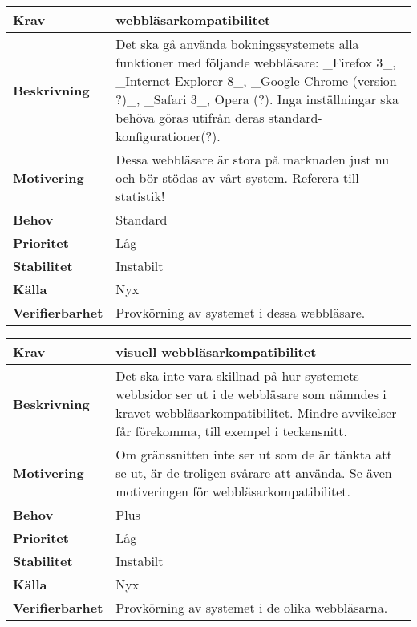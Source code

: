 \documentclass[a4paper, twoside, 11pt, titlepage]{article}
\begin{document}
		\begin{tabular} { | p{3cm} | p{12.2cm} | }
			\hline
			\textbf{Krav} & webbläsarkompatibilitet  \\
			\hline
			\textbf{Beskrivning} & Det ska gå använda bokningssystemets alla funktioner med följande webbläsare: \_Firefox 3\_, \_Internet Explorer 8\_, \_Google Chrome (version ?)\_, \_Safari 3\_, Opera (?). Inga inställningar ska behöva göras utifrån deras standard-konfigurationer(?).  \\
			\hline
			\textbf{Motivering} & Dessa webbläsare är stora på marknaden just nu och bör stödas av vårt system. Referera till statistik!  \\
			\hline
			\textbf{Behov} & Standard  \\
			\hline
			\textbf{Prioritet} & Låg  \\
			\hline
			\textbf{Stabilitet} & Instabilt  \\
			\hline
			\textbf{Källa} & Nyx  \\
			\hline
			\textbf{Verifierbarhet} & Provkörning av systemet i dessa webbläsare.  \\
			\hline
		\end{tabular}

		\begin{tabular} { | p{3cm} | p{12.2cm} | }
			\hline
			\textbf{Krav} & visuell webbläsarkompatibilitet  \\
			\hline
			\textbf{Beskrivning} & Det ska inte vara skillnad på hur systemets webbsidor ser ut i de webbläsare som nämndes i kravet webbläsarkompatibilitet. Mindre avvikelser får förekomma, till exempel i teckensnitt.  \\
			\hline
			\textbf{Motivering} & Om gränssnitten inte ser ut som de är tänkta att se ut, är de troligen svårare att använda. Se även motiveringen för webbläsarkompatibilitet.  \\
			\hline
			\textbf{Behov} & Plus  \\
			\hline
			\textbf{Prioritet} & Låg  \\
			\hline
			\textbf{Stabilitet} & Instabilt  \\
			\hline
			\textbf{Källa} & Nyx  \\
			\hline
			\textbf{Verifierbarhet} & Provkörning av systemet i de olika webbläsarna.  \\
			\hline
		\end{tabular}
\end{document}
